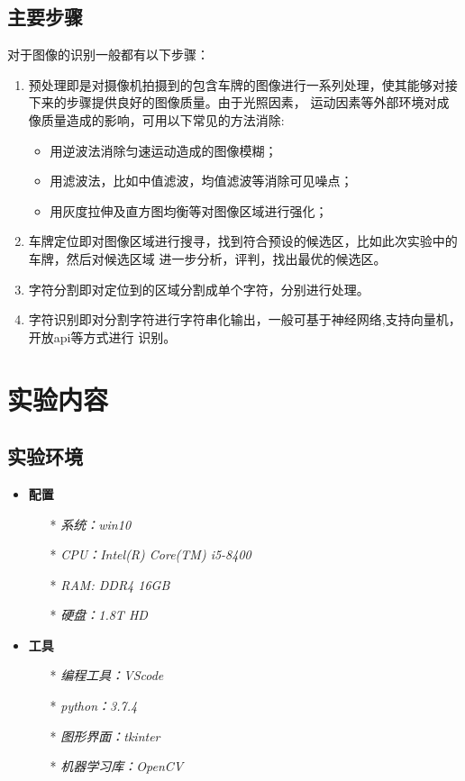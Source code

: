 \documentclass[UTF8,10pt,titlepage,a4paper]{ctexart}
\begin{document}
\subsection{主要步骤}
对于图像的识别一般都有以下步骤：
\begin{enumerate}
\item 预处理即是对摄像机拍摄到的包含车牌的图像进行一系列处理，使其能够对接下来的步骤提供良好的图像质量。由于光照因素，
运动因素等外部环境对成像质量造成的影响，可用以下常见的方法消除:
\begin{itemize}
  \item 用逆波法消除匀速运动造成的图像模糊；
  \item 用滤波法，比如中值滤波，均值滤波等消除可见噪点；
  \item 用灰度拉伸及直方图均衡等对图像区域进行强化；
\end{itemize}
\item 车牌定位即对图像区域进行搜寻，找到符合预设的候选区，比如此次实验中的车牌，然后对候选区域
进一步分析，评判，找出最优的候选区。
\item 字符分割即对定位到的区域分割成单个字符，分别进行处理。
\item 字符识别即对分割字符进行字符串化输出，一般可基于神经网络,支持向量机，开放api等方式进行
识别。
\end{enumerate}
\section{实验内容}
\subsection{实验环境}
\begin{itemize}
  \item \textbf{配置}
  \begin{itemize}
    \item[*] \emph{系统：win10 }
    \item[*] \emph{CPU：Intel(R) Core(TM) i5-8400}
    \item[*] \emph{RAM: DDR4 16GB}
    \item[*] \emph{硬盘：1.8T HD}
  \end{itemize}
  \item \textbf{工具}
  \begin{itemize}
    \item[*] \emph{编程工具：VScode}
    \item[*] \emph{python：3.7.4}
    \item[*] \emph{图形界面：tkinter}
    \item[*] \emph{机器学习库：OpenCV}
  \end{itemize} 
\end{itemize}
\end{document}
